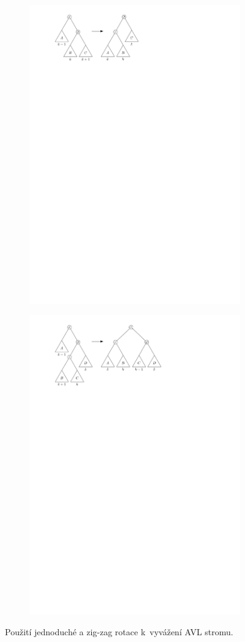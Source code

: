 \begin{figure}[h!]

\begin{subfigure}{0.9\textwidth}
  \centering
  \includegraphics[width=.65\linewidth]{../img/single_rotation_avl}
\end{subfigure}
\vskip 1cm
\begin{subfigure}{0.9\textwidth}
  \centering
  \includegraphics[width=.65\linewidth]{../img/zigzag_rotation_avl}
\end{subfigure}
\caption{Použití jednoduché a zig-zag rotace k~vyvážení AVL stromu.} 

\label{obr:rotace_avl} 
 
\end{figure}



